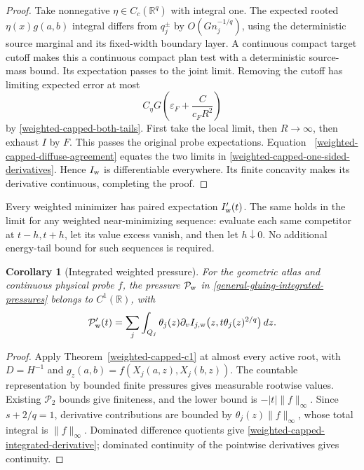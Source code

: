 \documentclass[11pt,reqno]{amsart}
\newtheorem{corollary}[theorem]{Corollary}
\theoremstyle{definition}
\theoremstyle{remark}
\numberwithin{equation}{section}
\newcommand{\R}{\mathbb R}
\begin{document}
\begin{proof}
Take nonnegative \(\eta\in C_c(\R^q)\) with integral one.
The expected rooted \(\eta(x)g(a,b)\) integral differs from
\(q_j^\pm\) by \(O(Gn_j^{-1/q})\), using the deterministic
source marginal and its fixed-width boundary layer. A continuous
compact target cutoff makes this a continuous compact plan test with
a deterministic source-mass bound. Its expectation passes to the
joint limit. Removing the cutoff has limiting expected error at most
\[
                 C_\eta G\left(\varepsilon_F+
                                      \frac{C}{c_FR^2}\right)
\]
by \eqref{weighted-capped-both-tails}. First take the local limit,
then \(R\to\infty\), then exhaust \(I\) by \(F\). This passes
the original probe expectations. Equation~
\eqref{weighted-capped-diffuse-agreement} equates the two limits in
\eqref{weighted-capped-one-sided-derivatives}. Hence \(I_{\rm w}\)
is differentiable everywhere. Its finite concavity makes its derivative
continuous, completing the proof.
\end{proof}

Every weighted minimizer has paired expectation \(I_{\rm w}'(t)\).
The same holds in the limit for any weighted near-minimizing sequence:
evaluate each same competitor at \(t-h,t+h\), let its value excess
vanish, and then let \(h\downarrow0\). No additional energy-tail
bound for such sequences is required.

\begin{corollary}[Integrated weighted pressure]
\label{weighted-capped-integrated-c1}
For the geometric atlas and continuous physical probe \(f\), the
pressure \(\mathcal P_{\rm w}\) in
\eqref{general-gluing-integrated-pressures} belongs to \(C^1(\R)\), with
\begin{equation}
\label{weighted-capped-integrated-derivative}
 \mathcal P_{\rm w}'(t)=\sum_j\int_{Q_j}\theta_j(z)
   \partial_v I_{j,\rm w}\bigl(z,t\theta_j(z)^{2/q}\bigr)\,dz.
\end{equation}
\end{corollary}
\begin{proof}
Apply Theorem~\ref{weighted-capped-c1} at almost every active root,
with \(D=H^{-1}\) and
\(g_z(a,b)=f(X_j(a,z),X_j(b,z))\). The countable representation
by bounded finite pressures gives measurable rootwise values. Existing
\(\mathcal P_2\) bounds give finiteness, and the lower bound is
\(-|t|\|f\|_\infty\). Since \(s+2/q=1\), derivative
contributions are bounded by \(\theta_j(z)\|f\|_\infty\), whose
total integral is \(\|f\|_\infty\). Dominated difference quotients
give \eqref{weighted-capped-integrated-derivative}; dominated continuity
of the pointwise derivatives gives continuity.
\end{proof}
\end{document}
